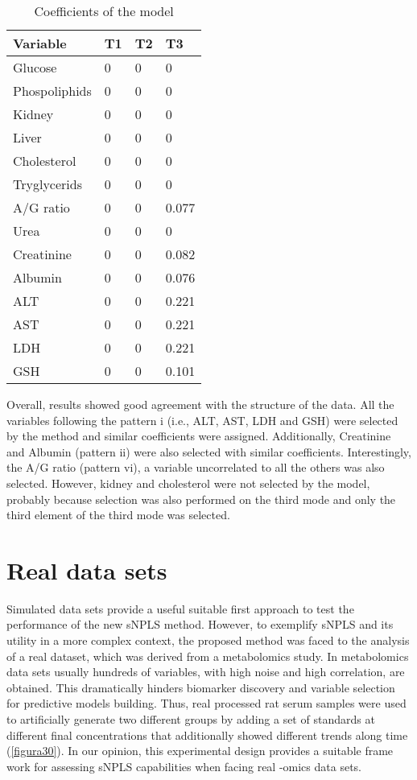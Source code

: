 \begin{table}[hbtp]
\centering
\begin{tabular}{@{}llll@{}}
\toprule
Variable      & T1 & T2 & T3    \\ \midrule
Glucose       & 0  & 0  & 0     \\
Phospoliphids & 0  & 0  & 0     \\
Kidney        & 0  & 0  & 0     \\
Liver         & 0  & 0  & 0     \\
Cholesterol   & 0  & 0  & 0     \\
Tryglycerids  & 0  & 0  & 0     \\
A/G ratio     & 0  & 0  & 0.077 \\
Urea          & 0  & 0  & 0     \\
Creatinine    & 0  & 0  & 0.082 \\
Albumin       & 0  & 0  & 0.076 \\
ALT           & 0  & 0  & 0.221 \\
AST           & 0  & 0  & 0.221 \\
LDH           & 0  & 0  & 0.221 \\
GSH           & 0  & 0  & 0.101 \\ \bottomrule
\end{tabular}%
\caption{Coefficients of the model}
\label{table:results_synth2}
\end{table}

Overall, results showed good agreement with the structure of the data. All the variables  following the pattern i (i.e., ALT, AST, LDH and GSH) were selected by the method and similar coefficients  were assigned. Additionally, Creatinine and Albumin (pattern ii) were also selected with similar coefficients. Interestingly,  the A/G ratio (pattern vi), a variable uncorrelated to all the others was also selected. However, kidney and cholesterol were not selected by the model, probably because selection was also performed on the third mode and only the third element of the third mode was selected.


\section{Real data sets}
\label{sec:realdata}
Simulated data sets provide a useful suitable first approach to test the performance of the new sNPLS method. However, to exemplify sNPLS and its utility in a more complex context, the proposed method was faced to the analysis of a real dataset, which was derived from a metabolomics study. In metabolomics data sets usually hundreds of variables, with high noise and high correlation, are obtained. This dramatically hinders biomarker discovery and variable selection for predictive models building.  Thus, real processed rat serum samples were used to artificially generate two different groups by adding a set of standards at different final concentrations that additionally showed different trends along time (\autoref{figura30}). In our opinion, this experimental design provides a suitable frame work for assessing sNPLS capabilities when facing real -omics data sets.


